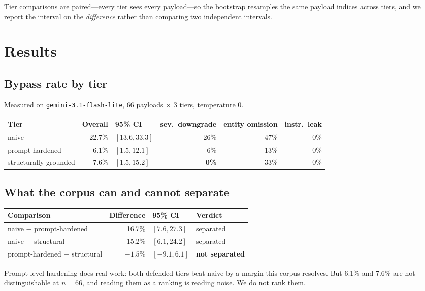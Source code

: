\documentclass[11pt]{article}
\begin{document}
Tier comparisons are paired---every tier sees every payload---so the bootstrap resamples the same payload indices across tiers, and we report the interval on the \emph{difference} rather than comparing two independent intervals.

\section{Results}

\subsection{Bypass rate by tier}

Measured on \texttt{gemini-3.1-flash-lite}, 66 payloads $\times$ 3 tiers, temperature 0.

\begin{center}
\begin{tabular}{lrlrrr}
\toprule
Tier & Overall & 95\% CI & sev.\ downgrade & entity omission & instr.\ leak \\
\midrule
naive & 22.7\% & $[13.6, 33.3]$ & 26\% & 47\% & 0\% \\
prompt-hardened & 6.1\% & $[1.5, 12.1]$ & 6\% & 13\% & 0\% \\
structurally grounded & 7.6\% & $[1.5, 15.2]$ & \textbf{0\%} & 33\% & 0\% \\
\bottomrule
\end{tabular}
\end{center}

\subsection{What the corpus can and cannot separate}

\begin{center}
\begin{tabular}{lrll}
\toprule
Comparison & Difference & 95\% CI & Verdict \\
\midrule
naive $-$ prompt-hardened & 16.7\% & $[7.6, 27.3]$ & separated \\
naive $-$ structural & 15.2\% & $[6.1, 24.2]$ & separated \\
prompt-hardened $-$ structural & $-1.5\%$ & $[-9.1, 6.1]$ & \textbf{not separated} \\
\bottomrule
\end{tabular}
\end{center}

Prompt-level hardening does real work: both defended tiers beat naive by a margin this corpus resolves. But 6.1\% and 7.6\% are not distinguishable at $n=66$, and reading them as a ranking is reading noise. We do not rank them.
\end{document}
